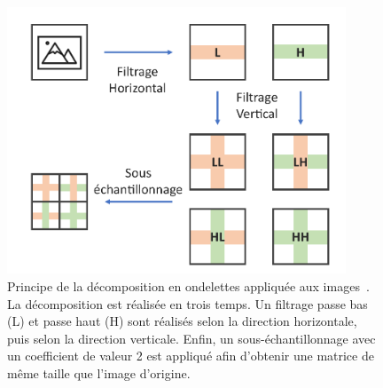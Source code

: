 \begin{figure}[H]
    \centering
    \includegraphics[width=0.9\textwidth]{contents/chapter_5/resources/scheme_dwt.pdf}
    \caption{Principe de la décomposition en ondelettes appliquée aux images~\cite{Livens1997}. La décomposition est réalisée en trois temps. Un filtrage passe bas (L) et passe haut (H) sont réalisés selon la direction horizontale, puis selon la direction verticale. Enfin, un sous-échantillonnage avec un coefficient de valeur 2 est appliqué afin d'obtenir une matrice de même taille que l'image d'origine.}
    \label{fig:scheme_dwt}
\end{figure}\par 

